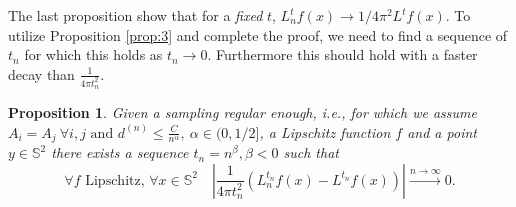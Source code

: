 \documentclass{article} %
\newtheorem{prop}{Proposition}
\renewcommand{\S}{\mathbb{S}}
\newcommand{\linefrac}[2]{
    {#1/#2}
}
\begin{document}
The last proposition show that for a \emph{fixed} $t$, $L_n^tf(x)\rightarrow \linefrac{1}{4\pi^2} L^tf(x)$. To utilize Proposition \ref{prop:3} and complete the proof, we need to find a sequence of $t_n$ for which this holds as $t_n \rightarrow 0$. Furthermore this should hold with a faster decay than $\frac{1}{4\pi t_n^2}$.
\begin{prop}\label{prop:2}
	Given a sampling regular enough, i.e., for which we assume $A_i=A_j \ \forall i,j\text{ and }d^{(n)}\leq \frac{C}{n^\alpha}, \ \alpha\in (0,\linefrac{1}{2}]$, a Lipschitz function $f$ and a point $y\in\S^2$ there exists a sequence $t_n = n^\beta, \beta<0$ such that
\begin{equation*}
    \forall f \text{ Lipschitz, } \forall x\in\S^2 \quad \left|\frac{1}{4\pi t_n^2}\left(L_n^{t_n}f(x) -  L^{t_n}f(x)\right)\right|\xrightarrow{n\to \infty}0.
\end{equation*}
\end{prop}
\end{document}
